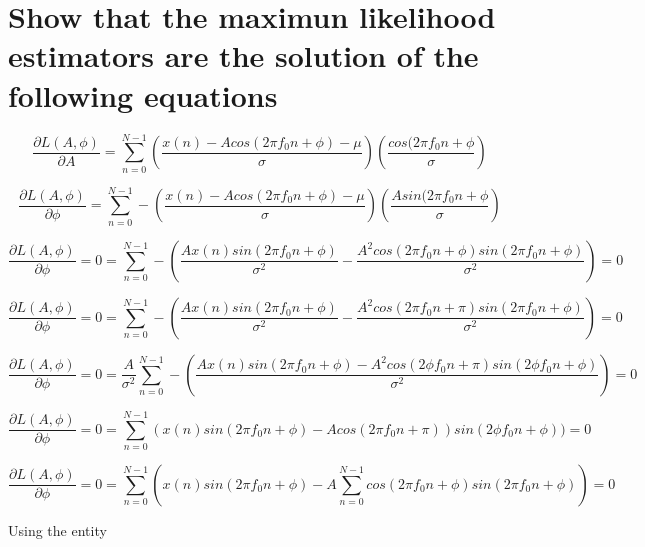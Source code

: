 \documentclass{report}
\begin{document}
\section{Show that the maximun likelihood estimators are the solution of the following equations}

\begin{equation}\label{key}
\frac{\partial L(A,\phi)}{\partial A} = \sum_{n=0}^{N-1} (\frac{x(n) - A cos (2\pi f_0 n + \phi)-\mu}{\sigma})(\frac{cos(2\pi f_0 n +\phi}{\sigma})
\end{equation}

\begin{equation}\label{key}
\frac{\partial L(A,\phi)}{\partial \phi} = \sum_{n=0}^{N-1} - (\frac{x(n) - A cos (2\pi f_0 n + \phi)-\mu}{\sigma})(\frac{Asin(2\pi f_0 n +\phi}{\sigma})
\end{equation}


\begin{equation}\label{key}
\frac{\partial L(A,\phi)}{\partial \phi} = 0 = \sum_{n=0}^{N-1} - (\frac{Ax(n)sin(2\pi f_0 n +\phi)}{\sigma^2}-\frac{A^2cos(2\pi f_0 n +\phi)sin(2\pi f_0 n +\phi)}{\sigma^2}) = 0
\end{equation}


\begin{equation}\label{key}
\frac{\partial L(A,\phi)}{\partial \phi} = 0 = \sum_{n=0}^{N-1} - (\frac{Ax(n)sin(2\pi f_0 n +\phi)}{\sigma^2}-\frac{A^2cos(2\pi f_0 n +\pi)sin(2\pi f_0 n +\phi)}{\sigma^2}) = 0
\end{equation}

\begin{equation}\label{key}
\frac{\partial L(A,\phi)}{\partial \phi} = 0 = \frac{A}{\sigma^2} \sum_{n=0}^{N-1} - (\frac{Ax(n)sin(2\pi f_0 n +\phi)-A^2cos(2\phi f_0 n +\pi)sin(2\phi f_0 n +\phi)}{\sigma^2}) = 0
\end{equation}


\begin{equation}\label{key}
\frac{\partial L(A,\phi)}{\partial \phi} = 0 = \sum_{n=0}^{N-1}(x(n)sin(2\pi f_0 n +\phi) - Acos(2\pi f_0 n +\pi))sin(2\phi f_0 n +\phi)) = 0
\end{equation}


\begin{equation}\label{key}
\frac{\partial L(A,\phi)}{\partial \phi} = 0 = \sum_{n=0}^{N-1}(x(n)sin(2\pi f_0 n +\phi) - A\sum_{n=0}^{N-1}cos(2\pi f_0 n +\phi)sin(2\pi f_0 n +\phi)) = 0
\end{equation}

Using the entity 
\end{document}
